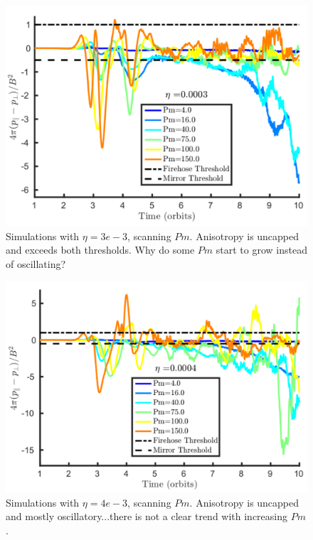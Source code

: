 \begin{figure}[h]
  \begin{center}  
    \includegraphics[width=.9\textwidth, angle=0.]{img/npLimiter-eta3-PmSel1_Sharma.pdf}
  \end{center}
  \caption{Simulations with $\eta=3e-3$, scanning $Pm$. Anisotropy is uncapped and exceeds both thresholds. Why do some $Pm$ start to grow instead of oscillating? }
  \label{fig:eta3np}
\end{figure}


\begin{figure}[h]
  \begin{center}  
    \includegraphics[width=.9\textwidth, angle=0.]{img/npLimiter-eta4-PmSel1_Sharma.pdf}
  \end{center}
  \caption{Simulations with $\eta=4e-3$, scanning $Pm$. Anisotropy is uncapped and mostly oscillatory...there is not a clear trend with increasing $Pm$. }
  \label{fig:eta4np}
\end{figure}


